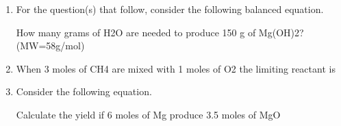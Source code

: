 \documentclass[main.tex]{subfiles}
\begin{document}
\begin{fullwidth}
\begin{multicols*}{2}
\begin{enumerate}
\item For the question(s) that follow, consider the following balanced equation.
	\begin{center}\end{center}
How many grams of H2O are needed to produce 150 g of Mg(OH)2? (MW=58g/mol)
\begin{enumerate}[label=(\alph*)]\vspace{-0.5cm}
\end{enumerate}\vspace{-0.5cm}

\item When 3 moles of CH4 are mixed with 1 moles of O2 the limiting reactant is  
\begin{center}\end{center}
\begin{enumerate}[label=(\alph*)]\vspace{-0.5cm}
\end{enumerate}\vspace{-0.5cm}

\item Consider the following equation. 
	\begin{center}\end{center}	
Calculate the yield if 6 moles of Mg produce 3.5 moles of MgO
\begin{enumerate}[label=(\alph*)]\vspace{-0.5cm}
\end{enumerate}\vspace{-0.5cm}


\end{enumerate}
\end{multicols*}
\end{fullwidth}
\end{document}
